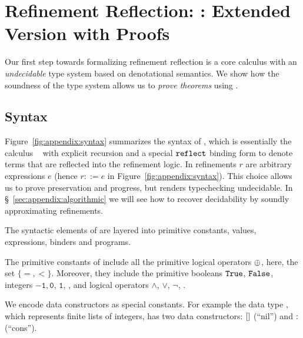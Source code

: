 \section{Refinement Reflection: \corelan: Extended Version with Proofs}
\label{sec:appendix:formalism}
\label{sec:appendix:types-reflection}

Our first step towards formalizing refinement
reflection is a core calculus \corelan with an
\emph{undecidable} type system based on
denotational semantics.
We show how the soundness of the type system
allows us to \emph{prove theorems} using \corelan.

%

\subsection{Syntax}

%
Figure~\ref{fig:appendix:syntax} summarizes the syntax of \corelan,
which is essentially the calculus \undeclang~\cite{Vazou14}
with explicit recursion and a special $\mathtt{reflect}$ binding form
to denote terms that are reflected into the refinement logic.
%
In \corelan refinements $r$ are arbitrary expressions $e$
(hence $r ::= e$ in Figure~\ref{fig:appendix:syntax}).
%
This choice allows us to prove preservation and progress,
but renders typechecking undecidable.
%
In \S~\ref{sec:appendix:algorithmic} we will see how to recover
decidability by soundly approximating refinements.

The syntactic elements of \corelan are layered into
primitive constants, values, expressions, binders
and programs.

The primitive constants of \corelan
include all the primitive logical
operators $\oplus$, here, the set $\{ =, <\}$.
%
Moreover, they include the
primitive booleans $\texttt{True}$, $\texttt{False}$,
integers $\mathtt{-1}, \mathtt{0}$, $\mathtt{1}$, \etc,
and logical operators $\mathtt{\land}$, $\mathtt{\lor}$, $\mathtt{\lnot}$, \etc.

%
We encode data constructors as special constants.
For example the data type \tintlist, which represents
finite lists of integers, has two data constructors: $[]$ (``nil'')
and $:$ (``cons'').


